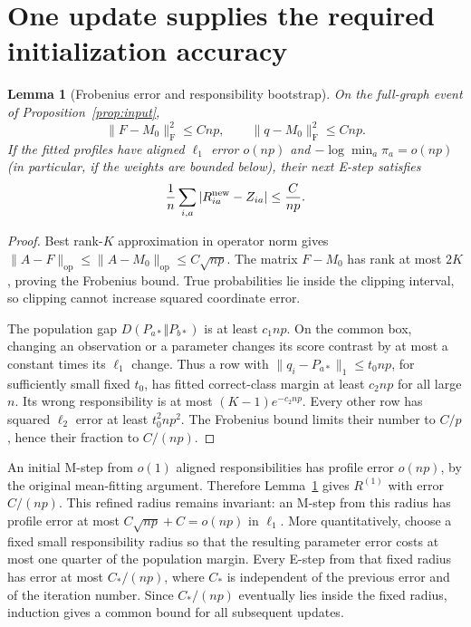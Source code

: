 \documentclass[11pt]{article}
\newtheorem{lemma}[theorem]{Lemma}
\newcommand{\op}{\mathrm{op}}
\newcommand{\F}{\mathrm F}
\begin{document}
\section{One update supplies the required initialization accuracy}
\begin{lemma}[Frobenius error and responsibility bootstrap]\label{lem:bootstrap}
On the full-graph event of Proposition~\ref{prop:input},
\[
 \|F-M_0\|_\F^2\le Cnp,\qquad \|q-M_0\|_\F^2\le Cnp.
\]
If the fitted profiles have aligned $\ell_1$ error $o(np)$ and $-\log\min_a\pi_a=o(np)$ (in particular, if the weights are bounded below), their next E-step satisfies
\[
 \frac1n\sum_{i,a}|R^{\rm new}_{ia}-Z_{ia}|\le \frac{C}{np}.
\]
\end{lemma}
\begin{proof}
Best rank-$K$ approximation in operator norm gives $\|A-F\|_\op\le\|A-M_0\|_\op\le C\sqrt{np}$. The matrix $F-M_0$ has rank at most $2K$, proving the Frobenius bound. True probabilities lie inside the clipping interval, so clipping cannot increase squared coordinate error.

The population gap $D(P_{a*}\Vert P_{b*})$ is at least $c_1np$. On the common box, changing an observation or a parameter changes its score contrast by at most a constant times its $\ell_1$ change. Thus a row with $\|q_i-P_{a*}\|_1\le t_0np$, for sufficiently small fixed $t_0$, has fitted correct-class margin at least $c_2np$ for all large $n$. Its wrong responsibility is at most $(K-1)e^{-c_2np}$. Every other row has squared $\ell_2$ error at least $t_0^2n p^2$. The Frobenius bound limits their number to $C/p$, hence their fraction to $C/(np)$.
\end{proof}

An initial M-step from $o(1)$ aligned responsibilities has profile error $o(np)$, by the original mean-fitting argument. Therefore Lemma~\ref{lem:bootstrap} gives $R^{(1)}$ with error $C/(np)$. This refined radius remains invariant: an M-step from this radius has profile error at most $C\sqrt{np}+C=o(np)$ in $\ell_1$. More quantitatively, choose a fixed small responsibility radius so that the resulting parameter error costs at most one quarter of the population margin. Every E-step from that fixed radius has error at most $C_*/(np)$, where $C_*$ is independent of the previous error and of the iteration number. Since $C_*/(np)$ eventually lies inside the fixed radius, induction gives a common bound for all subsequent updates.
\end{document}
